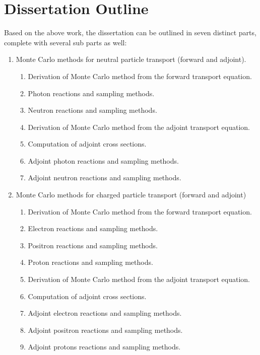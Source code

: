 \documentclass[letterpaper,12pt]{article}
\begin{document}
\section{Dissertation Outline}
Based on the above work, the dissertation can be outlined in seven distinct parts, complete with several sub parts as well:

\begin{enumerate}
    \item Monte Carlo methods for neutral particle transport (forward and adjoint).
      \begin{enumerate}
        \item Derivation of Monte Carlo method from the forward transport equation.
        \item Photon reactions and sampling methods.
        \item Neutron reactions and sampling methods.
        \item Derivation of Monte Carlo method from the adjoint transport equation.
        \item Computation of adjoint cross sections.
        \item Adjoint photon reactions and sampling methods.
        \item Adjoint neutron reactions and sampling methods.
      \end{enumerate}

    \item Monte Carlo methods for charged particle transport (forward and adjoint)
      \begin{enumerate}
        \item Derivation of Monte Carlo method from the forward transport equation.
        \item Electron reactions and sampling methods.
        \item Positron reactions and sampling methods.
        \item Proton reactions and sampling methods.
        \item Derivation of Monte Carlo method from the adjoint transport equation.
        \item Computation of adjoint cross sections.
        \item Adjoint electron reactions and sampling methods.
        \item Adjoint positron reactions and sampling methods.
        \item Adjoint protons reactions and sampling methods.
      \end{enumerate}


\end{enumerate}
\end{document}
